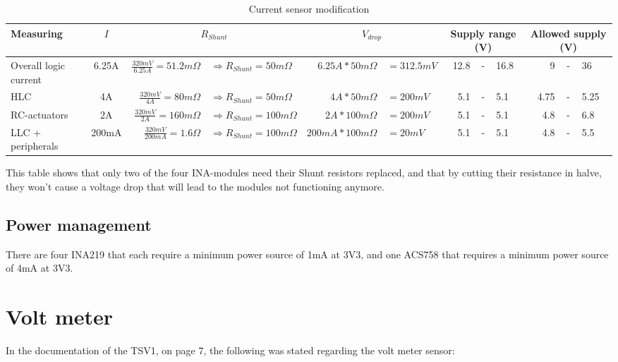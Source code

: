 \documentclass[ti,oneside,10pt]{uantwerpenreport}
\begin{document}
\begin{table}[h!]
    \centering
    \caption{Current sensor modification}
    \begin{adjustbox}{max width=\textwidth}
        \begin{tabular}{l c rl rl rcl rcl}
            \toprule
                \textbf{Measuring} &
                \textbf{$I$} &
                \multicolumn{2}{c}{\textbf{$R_{Shunt}$}} &
                \multicolumn{2}{c}{\textbf{$V_{drop}$}} &
                \multicolumn{3}{c}{\textbf{Supply range (V)}} &
                \multicolumn{3}{c}{\textbf{Allowed supply (V)}} \\
            \midrule
                Overall logic current & 6.25A & $\frac{320mV}{6.25A} = 51.2m\Omega$ & $\Rightarrow R_{Shunt} = 50m\Omega$  & $ 6.25A * 50m\Omega $  & $= 312.5mV $ & 12.8 & - & 16.8 & 9    & - & 36 \\
                HLC                   & 4A    & $\frac{320mV}{4A} = 80m\Omega$      & $\Rightarrow R_{Shunt} = 50m\Omega$  & $ 4A * 50m\Omega $     & $= 200mV $   & 5.1  & - & 5.1  & 4.75 & - & 5.25 \\
                RC-actuators          & 2A    & $\frac{320mV}{2A} = 160m\Omega$     & $\Rightarrow R_{Shunt} = 100m\Omega$ & $ 2A * 100m\Omega $    & $= 200mV $   & 5.1  & - & 5.1  & 4.8  & - & 6.8 \\
                LLC + peripherals     & 200mA & $\frac{320mV}{200mA} = 1.6\Omega$   & $\Rightarrow R_{Shunt} = 100m\Omega$ & $ 200mA * 100m\Omega $ & $= 20mV $    & 5.1  & - & 5.1  & 4.8  & - & 5.5 \\
            \bottomrule
        \end{tabular}
    \end{adjustbox}
    \label{tab:current_sensor_modification_table}
\end{table}
This table shows that only two of the four INA-modules need their Shunt resistors replaced, and that by cutting their resistance in halve, they won't cause a voltage drop that will lead to the modules not functioning anymore.
\subsection{Power management}
There are four INA219 that each require a minimum power source of 1mA at 3V3, and one ACS758 that requires a minimum power source of 4mA at 3V3.
\section{Volt meter}
In the documentation of the TSV1, on page 7, the following was stated regarding the volt meter sensor:
\end{document}
